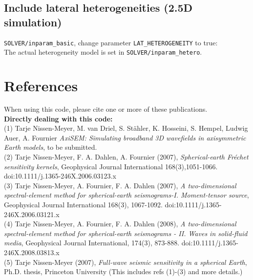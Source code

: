 \documentclass{article}
\begin{document}
\subsection{Include lateral heterogeneities (2.5D simulation)}
\verb|SOLVER/inparam_basic|, change parameter \verb|LAT_HETEROGENEITY| to true:\\
The actual heterogeneity model is set in \verb|SOLVER/inparam_hetero|. 




\newpage
\section{References}
When using this code, please cite one or more of these publications. \vspace*{0.2cm}\\

\noindent \textbf{Directly dealing with this code:}\vspace*{0.2cm}\\

(1) Tarje Nissen-Meyer, M. van Driel, S. St\"ahler, K. Hosseini,
S. Hempel, Ludwig Auer, A. Fournier \textit{AxiSEM: Simulating broadband 3D
  wavefields in axisymmetric Earth models}, to be submitted.\\

(2) Tarje Nissen-Meyer, F. A. Dahlen, A. Fournier (2007),
\textit{Spherical-earth Fr\'{e}chet sensitivity kernels},        
Geophysical Journal International 168(3),1051-1066. 
doi:10.1111/j.1365-246X.2006.03123.x                \\
                                                        
(3) Tarje Nissen-Meyer, A. Fournier, F. A. Dahlen (2007), 
\textit{A two-dimensional spectral-element method for
spherical-earth seismograms-I. Moment-tensor source}, 
Geophysical Journal International 168(3), 1067-1092. 
doi:10.1111/j.1365-246X.2006.03121.x                 \\
                                                       
(4) Tarje Nissen-Meyer, A. Fournier, F. A. Dahlen (2008),  
\textit{A two-dimensional spectral-element method for   
spherical-earth seismograms - II. Waves in solid-fluid media},
Geophysical Journal International, 174(3), 873-888.
doi:10.1111/j.1365-246X.2008.03813.x\\

(5) Tarje Nissen-Meyer (2007),
\textit{Full-wave seismic sensitivity in a spherical Earth},
Ph.D. thesis, Princeton University
(This includes refs (1)-(3) and more details.)\\
% 
\end{document}
